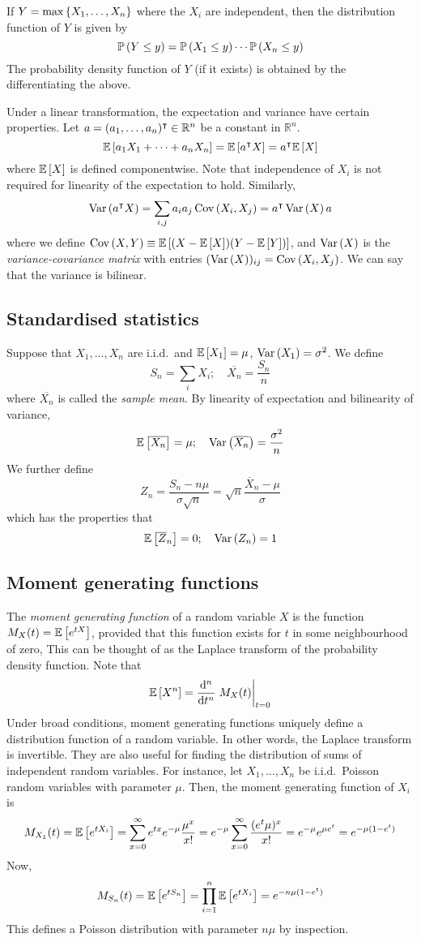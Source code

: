 If \( Y = \max\qty{X_1, \dots, X_n} \) where the \( X_i \) are independent, then the distribution function of \( Y \) is given by
\[
	\mathbb{P}\left({Y \leq y}\right) = \mathbb{P}\left({X_1 \leq y}\right) \cdots \mathbb{P}\left({X_n \leq y}\right)
\]
The probability density function of \( Y \) (if it exists) is obtained by the differentiating the above.

Under a linear transformation, the expectation and variance have certain properties.
Let \( a = (a_1, \dots, a_n)^\intercal \in \mathbb R^n \) be a constant in \( \mathbb R^n \).
\[
	\mathbb{E}\left[{a_1 X_1 + \dots + a_n X_n}\right] = \mathbb{E}\left[{a^\intercal X}\right] = a^\intercal \mathbb{E}\left[{X}\right]
\]
where \( \mathbb{E}\left[{X}\right] \) is defined componentwise.
Note that independence of \( X_i \) is not required for linearity of the expectation to hold.
Similarly,
\[
	\operatorname{Var}\left({a^\intercal X}\right) = \sum_{i,j} a_i a_j \operatorname{Cov}\left({X_i, X_j}\right) = a^\intercal \operatorname{Var}\left({X}\right) a
\]
where we define \( \operatorname{Cov}\left({X, Y}\right) \equiv \mathbb{E}\left[{(X - \mathbb{E}\left[{X}\right])(Y - \mathbb{E}\left[{Y}\right])}\right] \), and \( \operatorname{Var}\left({X}\right) \) is the \textit{variance-covariance matrix} with entries \( (\operatorname{Var}\left({X}\right))_{ij} = \operatorname{Cov}\left({X_i, X_j}\right) \).
We can say that the variance is bilinear.

\subsection{Standardised statistics}
Suppose that \( X_1, \dots, X_n \) are i.i.d.\ and \( \mathbb{E}\left[{X_1}\right] = \mu \), \( \operatorname{Var}\left({X_1}\right) = \sigma^2 \).
We define
\[
	S_n = \sum_i X_i;\quad \overline{X_n} = \frac{S_n}{n}
\]
where \( \overline{X_n} \) is called the \textit{sample mean}.
By linearity of expectation and bilinearity of variance,
\[
	\mathbb{E}\left[{\overline{X_n}}\right] = \mu;\quad \operatorname{Var}\left({\overline {X_n}}\right) = \frac{\sigma^2}{n}
\]
We further define
\[
	Z_n = \frac{S_n - n\mu}{\sigma\sqrt{n}} = \sqrt{n} \frac{\overline X_n - \mu}{\sigma}
\]
which has the properties that
\[
	\mathbb{E}\left[{\overline Z_n}\right] = 0;\quad \operatorname{Var}\left({Z_n}\right) = 1
\]

\subsection{Moment generating functions}
The \textit{moment generating function} of a random variable \( X \) is the function \( M_X(t) = \mathbb{E}\left[{e^{tX}}\right] \), provided that this function exists for \( t \) in some neighbourhood of zero,
This can be thought of as the Laplace transform of the probability density function.
Note that
\[
	\expect{X^n} = \dv[n]{t} \eval{M_X(t)}_{t = 0}
\]
Under broad conditions, moment generating functions uniquely define a distribution function of a random variable.
In other words, the Laplace transform is invertible.
They are also useful for finding the distribution of sums of independent random variables.
For instance, let \( X_1, \dots, X_n \) be i.i.d.\ Poisson random variables with parameter \( \mu \).
Then, the moment generating function of \( X_i \) is
\[
	M_{X_1}(t) = \mathbb{E}\left[{e^{tX_i}}\right] = \sum_{x = 0}^\infty e^{tx} e^{-\mu} \frac{\mu^x}{x!} = e^{-\mu} \sum_{x=0}^\infty \frac{(e^t \mu)^x}{x!} = e^{-\mu} e^{\mu e^t} = e^{-\mu(1-e^t)}
\]
Now,
\[
	M_{S_n}(t) = \mathbb{E}\left[{e^{tS_n}}\right] = \prod_{i=1}^n \mathbb{E}\left[{e^{tX_i}}\right] = e^{-n\mu(1-e^t)}
\]
This defines a Poisson distribution with parameter \( n \mu \) by inspection.

